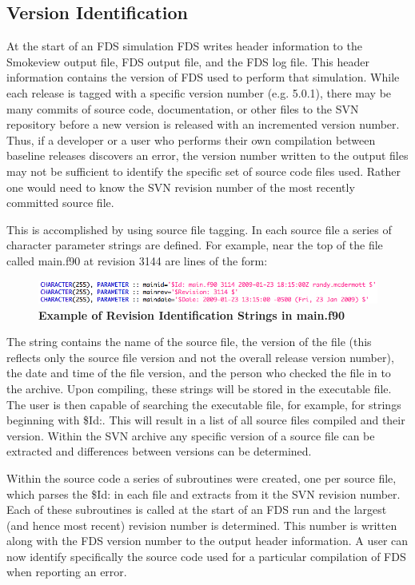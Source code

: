 \documentclass[11pt]{book}
\begin{document}
\subsection{Version Identification}

At the start of an FDS simulation FDS writes header information to the Smokeview output file, FDS output file,
and the FDS log file.  This header information contains the version of FDS used to perform that simulation.
While each release is tagged with a specific version number (e.g. 5.0.1), there may be many commits of source
code, documentation, or other files to the SVN repository before a new version is released with an incremented
version number.  Thus, if a developer or a user who performs their own compilation between baseline releases
discovers an error, the version number written to the output files may not be sufficient to identify the
specific set of source code files used.  Rather one would need to know the SVN revision number of the most
recently committed source file.

This is accomplished by using source file tagging.  In each source file a series of character parameter
strings are defined.  For example, near the top of the file called main.f90 at revision 3144 are lines of the form:

\begin{figure}[ht!]
\includegraphics[width=\textwidth]{FIGURES/RevisionStrings.jpg}
\caption{\bf Example of Revision Identification Strings in main.f90}
\label{fig:revstrings}
\end{figure}

\noindent
The string contains the name of the source file, the version of the file (this reflects only the source
file version and not the overall release version number), the date and time of the file version, and
the person who checked the file in to the archive.  Upon compiling, these strings will be stored in the
executable file.  The user is then capable of searching the executable file, for example, for strings
beginning with {\ct \$Id:}.  This will result in a list of all source files compiled and their version.
Within the SVN archive any specific version of a source file can be extracted and differences between
versions can be determined.

Within the source code a series of subroutines were created, one per source file, which parses the {\ct \$Id:} in
each file and extracts from it the SVN revision number.  Each of these subroutines is called at the start
of an FDS run and the largest (and hence most recent) revision number is determined.  This number is written
along with the FDS version number to the output header information.  A user can now identify specifically
the source code used for a particular compilation of FDS when reporting an error.
\end{document}
